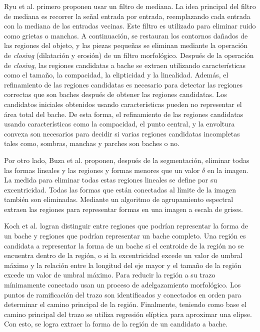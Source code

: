 		Ryu et al. primero proponen usar un filtro de mediana. La idea principal del filtro de mediana es recorrer la señal 
		entrada por entrada, reemplazando cada entrada con la mediana de las entradas vecinas. Este filtro es utilizado para eliminar ruido como grietas o manchas. 
		A continuación, se restauran los contornos dañados de las regiones del objeto, y las piezas pequeñas se eliminan mediante la operación de \emph{closing}
		(dilatación y erosión) de un filtro morfológico. Después de la operación de \emph{closing}, las regiones candidatas a bache se extraen utilizando 
		características como el tamaño, la compacidad, la elipticidad y la linealidad. Además, el refinamiento de las regiones candidatas es necesario para
		detectar las regiones correctas que son baches después de obtener las regiones candidatas. Los candidatos iniciales obtenidos usando características
		pueden no representar el área total del bache. De esta forma, el refinamiento de las regiones candidatas usando características como la compacidad,
		el punto central, y la envoltura convexa son necesarios para decidir si varias regiones candidatas incompletas tales como, sombras, manchas y
		parches son baches o no.

		Por otro lado, Buza et al. proponen, después de la segmentación, eliminar todas las formas lineales  y las regiones y
		formas menores que un valor $\delta$ en la imagen. La medida para eliminar todas estas regiones lineales se define por su excentricidad. Todas 
		las formas que están conectadas al límite de la imagen también son eliminadas. Mediante un algoritmo de agrupamiento espectral extraen 
		las regiones para representar formas en una imagen a escala de grises. 

		Koch et al. logran distinguir entre regiones que podrían representar la forma de un bache y 
		regiones que podrían representar un bache completo. Una región es candidata a representar la forma de un bache si 
		el centroide de la región no se encuentra dentro de la región, o si la excentricidad excede un valor de umbral 
		máximo y la relación entre la longitud del eje mayor y el tamaño de la región excede un valor de umbral máximo. 
		Para reducir la región a su trazo  mínimamente conectado usan un proceso de adelgazamiento morfológico. Los puntos de 
		ramificación del trazo son identificados y conectados en orden para determinar el camino principal de la región. Finalmente, 
		teniendo como base el camino principal del trazo se utiliza regresión elíptica para aproximar una elipse. Con esto, se logra 
		extraer la forma de la región de un candidato a bache.

